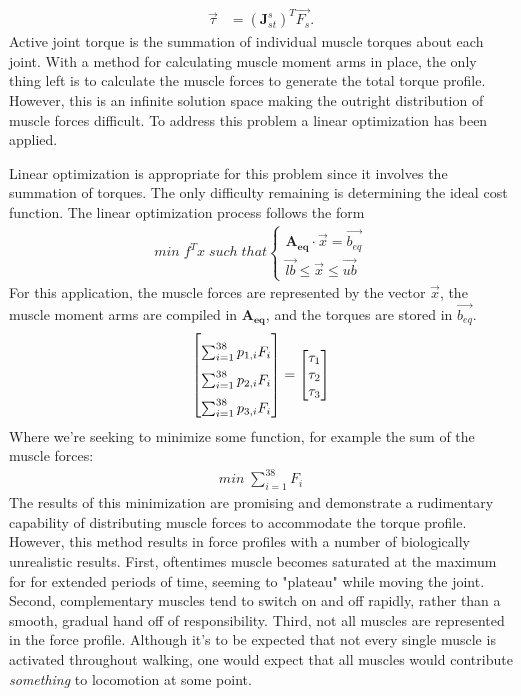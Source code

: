 \documentclass[runningheads,a4paper]{llncs}
\begin{document}
			\begin{align*}
				\overrightarrow{\tau} &= (\textbf{J}^{s}_{st})^{T}\overrightarrow{F_{s}}.
			\end{align*}
		Active joint torque is the summation of individual muscle torques about each joint. With a method for calculating muscle moment arms in place, the only thing left is to calculate the muscle forces to generate the total torque profile. However, this is an infinite solution space making the outright distribution of muscle forces difficult. To address this problem a linear optimization has been applied. \par
		Linear optimization is appropriate for this problem since it involves the summation of torques. The only difficulty remaining is determining the ideal cost function. The linear optimization process follows the form
			\begin{align*}
				min\;f^{T} x\;such\;that 
				\begin{cases} 
				 	\mathbf{A_{eq}} \cdot \overrightarrow{x} = \overrightarrow{b_{eq}} \\
					\overrightarrow{lb} \leq \overrightarrow{x} \leq \overrightarrow{ub} 
				\end{cases}
			\end{align*}
		For this application, the muscle forces are represented by the vector $\overrightarrow{x}$, the muscle moment arms are compiled in $\mathbf{A_{eq}}$, and the torques are stored in $\overrightarrow{b_{eq}}$. 
			\begin{align*}
				{\setlength\extrarowheight{8pt}\begin{bmatrix}
					\sum_{i=1}^{38} p_{1,i} F_{i} \\
					\sum_{i=1}^{38} p_{2,i} F_{i} \\
					\sum_{i=1}^{38} p_{3,i} F_{i}
				\end{bmatrix}} =
				\begin{bmatrix}
					\tau_{1} \\
					\tau_{2} \\
					\tau_{3}
				\end{bmatrix}
			\end{align*}
		Where we're seeking to minimize some function, for example the sum of the muscle forces:
			\begin{align*}
				min\;\sum_{i=1}^{38} F_{i} 
			\end{align*}
		The results of this minimization are promising and demonstrate a rudimentary capability of distributing muscle forces to accommodate the torque profile. However, this method results in force profiles with a number of biologically unrealistic results. First, oftentimes muscle becomes saturated at the maximum for for extended periods of time, seeming to "plateau" while moving the joint. Second, complementary muscles tend to switch on and off rapidly, rather than a smooth, gradual hand off of responsibility. Third, not all muscles are represented in the force profile. Although it's to be expected that not every single muscle is activated throughout walking, one would expect that all muscles would contribute \textit{something} to locomotion at some point.\par
\end{document}
